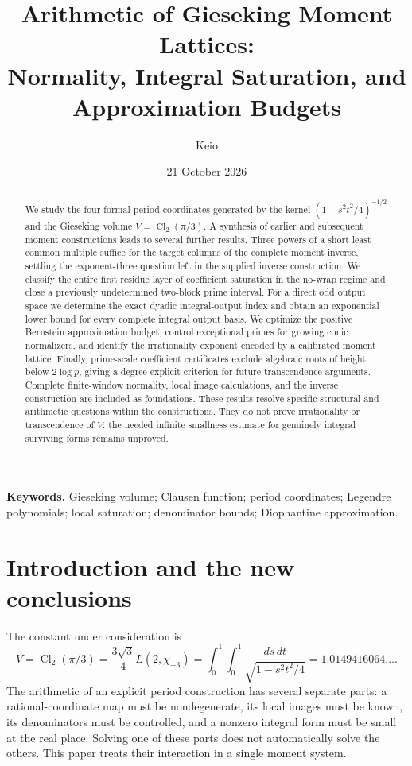 \documentclass[11pt,a4paper]{article}
\title{Arithmetic of Gieseking Moment Lattices:\\
Normality, Integral Saturation, and Approximation Budgets}
\author{Keio}
\date{21 October 2026}
\numberwithin{equation}{section}
\theoremstyle{definition}\newtheorem{definition}[theorem]{Definition}
\theoremstyle{remark}\newtheorem{remark}[theorem]{Remark}
\DeclareMathOperator{\Cl}{Cl}\DeclareMathOperator{\lcm}{lcm}
\begin{document}
\maketitle
\begin{abstract}
We study the four formal period coordinates generated by the kernel
$(1-s^2t^2/4)^{-1/2}$ and the Gieseking volume
$V=\Cl_2(\pi/3)$. A synthesis of earlier and subsequent moment constructions
leads to several further results. Three powers of a short least common
multiple suffice for the target columns of the complete moment inverse,
settling the exponent-three question left in the supplied inverse construction.
We classify the entire first residue layer of coefficient saturation in the
no-wrap regime and close a previously undetermined two-block prime interval.
For a direct odd output space we determine the exact dyadic integral-output
index and obtain an exponential lower bound for every complete integral
output basis. We optimize the positive Bernstein approximation budget,
control exceptional primes for growing conic normalizers, and identify the
irrationality exponent encoded by a calibrated moment lattice. Finally,
prime-scale coefficient certificates exclude algebraic roots of height below
$2\log p$, giving a degree-explicit criterion for future transcendence
arguments. Complete finite-window normality, local image calculations, and
the inverse construction are included as foundations. These results resolve
specific structural and arithmetic questions within the constructions.
They do not prove irrationality or transcendence of $V$: the needed
infinite smallness estimate for genuinely integral surviving forms remains
unproved.
\end{abstract}
\vspace{4pt}
\noindent\textbf{Keywords.} Gieseking volume; Clausen function; period coordinates;
Legendre polynomials; local saturation; denominator bounds; Diophantine approximation.
\newpage
\tableofcontents
\newpage

\section{Introduction and the new conclusions}
The constant under consideration is
\begin{equation}\label{intro:V}
 V=\Cl_2(\pi/3)=\frac{3\sqrt3}{4}L(2,\chi_{-3})
 =\int_0^1\!\int_0^1\frac{ds\,dt}{\sqrt{1-s^2t^2/4}}
 =1.0149416064\ldots.
\end{equation}
The arithmetic of an explicit period construction has several separate
parts: a rational-coordinate map must be nondegenerate, its local images
must be known, its denominators must be controlled, and a nonzero integral
form must be small at the real place. Solving one of these parts does not
automatically solve the others. This paper treats their interaction in a
single moment system.
\end{document}
